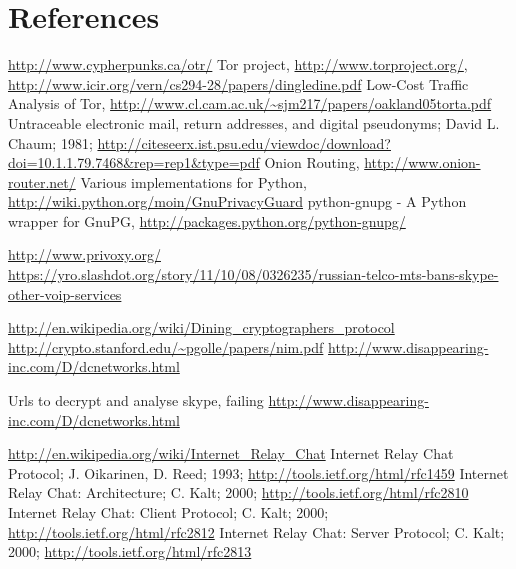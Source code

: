 \section{References}
\begin{thebibliography}{666}
 \url{http://www.cypherpunks.ca/otr/}
 Tor project, \url{http://www.torproject.org/},
    \url{http://www.icir.org/vern/cs294-28/papers/dingledine.pdf}
 Low-Cost Traffic Analysis of Tor,
    \url{http://www.cl.cam.ac.uk/~sjm217/papers/oakland05torta.pdf}
 Untraceable electronic mail, return addresses, and digital pseudonyms;
    David L. Chaum; 1981;
    \url{http://citeseerx.ist.psu.edu/viewdoc/download?doi=10.1.1.79.7468&rep=rep1&type=pdf}
 Onion Routing, \url{http://www.onion-router.net/}
 Various implementations for Python,
    \url{http://wiki.python.org/moin/GnuPrivacyGuard}
 python-gnupg - A Python wrapper for GnuPG,
    \url{http://packages.python.org/python-gnupg/}

 \url{http://www.privoxy.org/}
\url{https://yro.slashdot.org/story/11/10/08/0326235/russian-telco-mts-bans-skype-other-voip-services}

\url{http://en.wikipedia.org/wiki/Dining_cryptographers_protocol}
\url{http://crypto.stanford.edu/~pgolle/papers/nim.pdf}
\url{http://www.disappearing-inc.com/D/dcnetworks.html}

 Urls to decrypt and analyse skype, failing
\url{http://www.disappearing-inc.com/D/dcnetworks.html}

 \url{http://en.wikipedia.org/wiki/Internet_Relay_Chat}
 Internet Relay Chat Protocol; J. Oikarinen, D. Reed; 1993;
    \url{http://tools.ietf.org/html/rfc1459}
 Internet Relay Chat: Architecture; C. Kalt; 2000;
    \url{http://tools.ietf.org/html/rfc2810}
 Internet Relay Chat: Client Protocol; C. Kalt; 2000;
    \url{http://tools.ietf.org/html/rfc2812}
 Internet Relay Chat: Server Protocol; C. Kalt; 2000;
    \url{http://tools.ietf.org/html/rfc2813}

\end{thebibliography}
